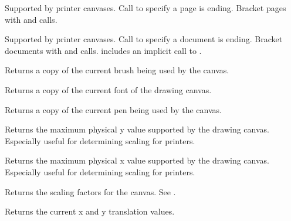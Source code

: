 Supported by printer canvases. Call to specify a page is
ending. Bracket pages with  and 
calls.


Supported by printer canvases. Call to specify a document is
ending. Bracket documents with  and
 calls.  includes
an implicit call to .


Returns a copy of the current brush being used by the canvas.


Returns a copy of the current font of the drawing canvas.


Returns a copy of the current pen being used by the canvas.


Returns the maximum physical y value supported by the
drawing canvas. Especially useful for determining scaling
for printers.


Returns the maximum physical x value supported by the
drawing canvas. Especially useful for determining scaling
for printers.


Returns the scaling factors for the
canvas. See .


Returns the current x and y translation values.

